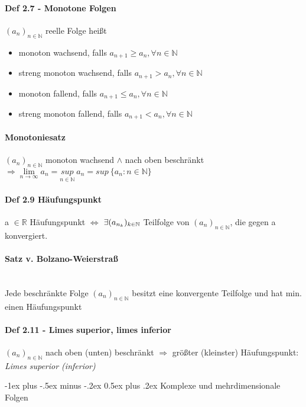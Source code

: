 \documentclass[paper=a3,paper=landscape, fontsize=9pt, DIV=30]{scrartcl}
\makeatletter
\newcommand{\real}{{\mathbb{R}}}
\newcommand{\nat}{\mathbb{N}}
\newcommand{\aseq}{(a_n)_{n \in \nat}}
\renewcommand{\section}{\@startsection{section}{1}{0mm}%
  {-1ex plus -.5ex minus -.2ex}%
  {0.5ex plus .2ex}%
  {\color{blue}\normalfont\large\bfseries}}
\makeatother
\begin{document}
\begin{multicols*}{4}
  \paragraph{Def 2.7 - Monotone Folgen}
  $\aseq$ reelle Folge heißt
  \begin{itemize}
  \item monoton wachsend, falls $a_{n+1} \geq a_n, \forall n \in \nat$
  \item streng monoton wachsend, falls  $a_{n+1} > a_n, \forall n \in \nat$
  \item monoton fallend, falls  $a_{n+1} \leq a_n, \forall n \in \nat$
  \item streng monoton fallend, falls  $a_{n+1} < a_n, \forall n \in \nat$
  \end{itemize}

 \paragraph{Monotoniesatz}
 $\aseq$ monoton wachsend $\wedge$ nach oben beschränkt $\Rightarrow \lim\limits_{n \rightarrow \infty} a_n = \underset{n \in \nat}{sup}\:a_n = sup\:\{a_n:n \in \nat\}$


  \paragraph{Def 2.9 Häufungspunkt}
  a $\in \real$ Häufungspunkt $\Leftrightarrow$ $\\\exists (a_{n_k})_{k \in \nat}$ Teilfolge von $\aseq$, die gegen a konvergiert.


 \paragraph{Satz v. Bolzano-Weierstraß}\hspace{0pt} \\
 Jede beschränkte Folge $\aseq$ besitzt eine konvergente Teilfolge und hat min. einen Häufungspunkt


  \paragraph{Def 2.11 - Limes superior, limes inferior}
  $\aseq$ nach oben (unten) beschränkt $\Rightarrow$ größter (kleinster) Häufungspunkt: \emph{Limes superior (inferior)}



\section{Komplexe und mehrdimensionale Folgen}


\end{multicols*}
\end{document}
